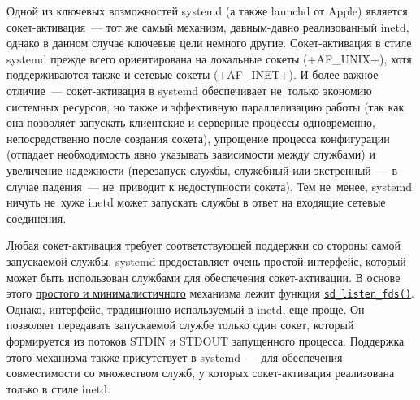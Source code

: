 \documentclass[10pt,oneside,a4paper]{article}
\newcommand{\hreftt}[2]{\href{#1}{\texttt{#2}}}
\begin{document}
Одной из ключевых возможностей systemd (а также launchd от Apple) является
сокет-активация~--- тот же самый механизм, давным-давно реализованный inetd,
однако в данном случае ключевые цели немного другие. Сокет-активация в стиле
systemd прежде всего ориентирована на локальные сокеты (+AF_UNIX+), хотя
поддерживаются также и сетевые сокеты (+AF_INET+). И более важное отличие~---
сокет-активация в systemd обеспечивает не~только экономию системных ресурсов,
но также и эффективную параллелизацию работы (так как она позволяет запускать
клиентские и серверные процессы одновременно, непосредственно после создания
сокета), упрощение процесса конфигурации (отпадает необходимость явно указывать
зависимости между службами) и увеличение надежности (перезапуск службы,
служебный или экстренный~--- в случае падения~--- не~приводит к недоступности
сокета). Тем не~менее, systemd ничуть не~хуже inetd может запускать службы в
ответ на входящие сетевые соединения.

Любая сокет-активация требует соответствующей поддержки со стороны самой
запускаемой службы. systemd предоставляет очень простой интерфейс, который может
быть использован службами для обеспечения сокет-активации. В основе этого
\href{http://0pointer.de/blog/projects/socket-activation.html}{простого и
минималистичного} механизма лежит функция
\hreftt{http://0pointer.de/public/systemd-man/sd_listen_fds.html}{sd\_listen\_fds()}.
Однако, интерфейс, традиционно используемый в inetd, еще проще. Он позволяет
передавать запускаемой службе только один сокет, который формируется из потоков
STDIN и STDOUT запущенного процесса. Поддержка этого механизма также
присутствует в systemd~--- для обеспечения совместимости со множеством служб,
у которых сокет-активация реализована только в стиле inetd.
\end{document}

